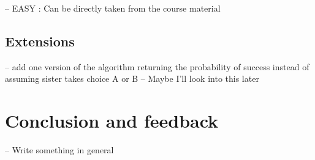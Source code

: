 \documentclass[a4paper,12pt,fleqn]{article}
\begin{document}
-- EASY : Can be directly taken from the course material

\subsection{Extensions} \label{sub:extensions}
-- add one version of the algorithm returning the probability of success instead of assuming sister takes choice A or B
-- Maybe I'll look into this later


\section{Conclusion and feedback}

-- Write something in general

\end{document}
